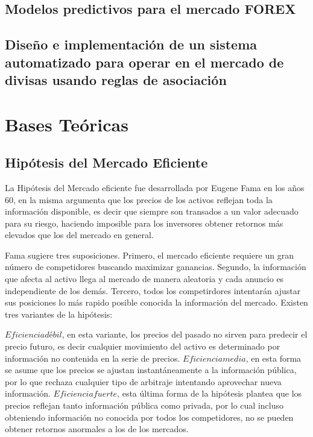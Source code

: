 \documentclass[a4paper,12pt]{Latex/Classes/PhDthesisPSnPDF}
\begin{document}
\subsection{Modelos predictivos para el mercado FOREX}

\subsection{Diseño e implementación de un sistema automatizado para operar en el mercado de divisas usando reglas de asociación}

\section{Bases Teóricas}


\subsection{Hipótesis del Mercado Eficiente}

La Hipótesis del Mercado eficiente fue desarrollada por Eugene Fama en los años 60, en la misma argumenta que los precios de los activos reflejan toda la información disponible, es decir que siempre son transados a un valor adecuado para su riesgo, haciendo imposible para los inversores obtener retornos más elevados que los del mercado en general. 

Fama sugiere tres suposiciones. Primero, el mercado eficiente requiere un gran número de competidores buscando maximizar ganancias. Segundo, la información que afecta al activo llega al mercado de manera aleatoria y cada anuncio es independiente de los demás. Tercero, todos los competirdores intentarán ajustar sus posiciones lo más rapido posible conocida la información del mercado. Existen tres variantes de la hipótesis:

$Eficiencia débil$, en esta variante, los precios del pasado no sirven para predecir el precio futuro, es decir cualquier movimiento del activo es determinado por información no contenida en la serie de precios. $Eficiencia media$, en esta forma se asume que los precios se ajustan instantáneamente a la información pública, por lo que rechaza cualquier tipo de arbitraje intentando aprovechar nueva información. $Eficiencia fuerte$, esta última forma de la hipótesis plantea que los precios reflejan tanto información pública como privada, por lo cual incluso obteniendo información no conocida por todos los competidores, no se pueden obtener retornos anormales a los de los mercados.
\end{document}
